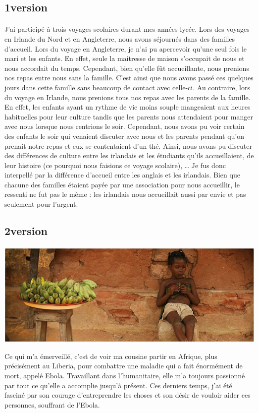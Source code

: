 \subsection{1\ier version}
\paragraph{}
J’ai participé à trois voyages scolaires durant mes années lycée. Lors des voyages en Irlande du Nord et en Angleterre, nous avons séjournés dans des familles d’accueil. Lors du voyage en Angleterre, je n’ai pu apercevoir qu’une seul fois le mari et les enfants. En effet, seule la maitresse de maison s’occupait de nous et nous accordait du temps. Cependant, bien qu’elle fût accueillante, nous prenions nos repas entre nous sans la famille. C’est ainsi que nous avons passé ces quelques jours dans cette famille sans beaucoup de contact avec celle-ci. Au contraire, lors du voyage en Irlande, nous prenions tous nos repas avec les parents de la famille. En effet, les enfants ayant un rythme de vie moins souple mangeaient aux heures habituelles pour leur culture tandis que les parents nous attendaient pour manger avec nous lorsque nous rentrions le soir. Cependant, nous avons pu voir certain des enfants le soir qui venaient discuter avec nous et les parents pendant qu’on prenait notre repas et eux se contentaient d’un thé. Ainsi, nous avons pu discuter des différences de culture entre les irlandais et les étudiants qu’ils accueillaient, de leur histoire (ce pourquoi nous faisions ce voyage scolaire), … Je fus donc interpellé par la différence d’accueil entre les anglais et les irlandais. Bien que chacune des familles étaient payée par une association pour nous accueillir, le ressenti ne fut pas le même : les irlandais nous accueillait aussi par envie et pas seulement pour l’argent.

\subsection{2\ieme version}
\paragraph{}
\begin{center}
\includegraphics[scale=0.7]{Afrique.jpg}
\end{center}
Ce qui m'a émerveillé, c'est de voir ma cousine partir en Afrique, plus précisément au
Liberia, pour combattre une maladie qui a fait énormément de mort, appelé Ebola.
Travaillant dans l'humanitaire, elle m'a toujours passionné par tout ce qu'elle a accomplie jusqu'à présent. Ces derniers temps, j'ai été fasciné par son courage d'entreprendre les choses et son désir de vouloir aider ces personnes, souffrant de l’Ebola.

